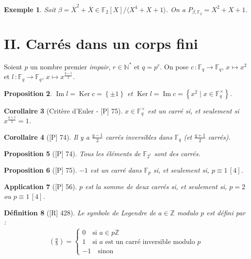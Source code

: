 \documentclass[10pt, a4paper, parskip=full, twoside, twocolumn]{report}
\newtheorem{definition}{Définition}
\newtheorem{proposition}[definition]{Proposition}
\newtheorem{corollary}[definition]{Corollaire}
\newtheorem{example}[definition]{Exemple}
\newtheorem{application}[definition]{Application}
\newcommand{\IN}{\mathbb{N}}
\newcommand{\IZ}{\mathbb{Z}}
\newcommand{\IF}{\mathbb{F}}
\DeclareMathOperator{\im}{Im}
\DeclareMathOperator{\Ker}{Ker}
\begin{document}
\begin{example}
	Soit $\beta = \overline{X}^2 + \overline{X} \in \IF_2[X]/\langle X^4 + X + 1\rangle$. On a $P_{\beta, \IF_2} = X^2 + X + 1$.
\end{example}

\section*{II. Carrés dans un corps fini}

\textcolor{paragraphtext}{
	Soient $p$ un nombre premier \emph{impair}, 
	$r\in\IN^*$ et $q = p^r$. 
	On pose $c\,\colon\IF_q\to\IF_q$, $x\mapsto x^2$ 
	et $l\,\colon \IF_q\to\IF_q$, $x\mapsto x^{\frac{q-1}{2}}$.}

\begin{proposition}
	$\im l = \Ker c = \left\{\pm 1\right\}$ et $\Ker l = \im c = \left\{x^2\mid x\in \IF_q^{\times}\right\}$.
\end{proposition}

\begin{corollary}[Critère d'Euler - \textnormal{[P] 75}]
	$x\in\IF_q^{\times}$ est un carré si, et seulement si $x^{\frac{q+1}{2}}=1$.
\end{corollary}

\begin{corollary}[\textnormal{[P] 74}]
	Il y a $\frac{q-1}{2}$ carrés inversibles dans $\IF_q$ (et $\frac{q+1}{2}$ carrés).
\end{corollary}

\begin{proposition}[\textnormal{[P] 74}]
	Tous les éléments de $\IF_{2^r}$ sont des carrés.
\end{proposition}

\begin{proposition}[\textnormal{[P] 75}]
	$-1$ est un carré dans $\IF_p$ si, et seulement si, $p\equiv 1\,[4]$.
\end{proposition}

\begin{application}[\textnormal{[P] 56}]
$p$ est la somme de deux carrés si, et seulement si, $p=2$ ou $p\equiv 1\,[4]$.
\end{application}

\begin{definition}[\textnormal{[R] 428}]
	Le \emph{symbole de Legendre de $a\in\IZ$ modulo $p$} est défini par :
	\begin{align*}
		\left(\frac{a}{b}\right) = \begin{cases}
			0\quad \text{si } a\in p\IZ \\
			1\quad \text{si $a$ est un carré inversible modulo $p$} \\
			-1\quad \text{sinon}
		\end{cases}
	\end{align*}
\end{definition}
\end{document}
